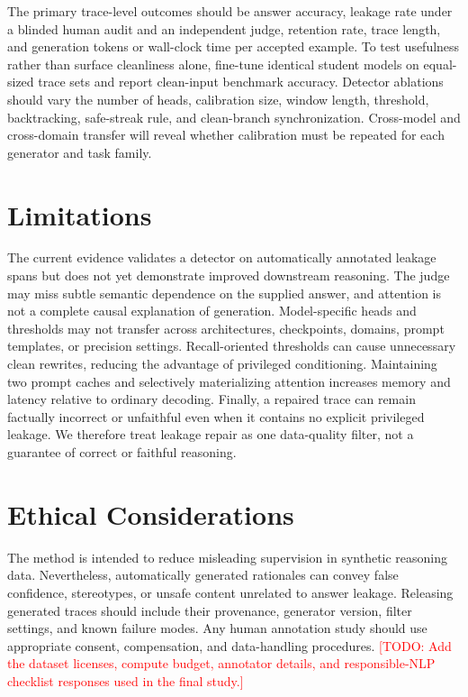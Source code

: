 \documentclass[11pt]{article}
\newcommand{\todo}[1]{\textcolor{red}{[TODO: #1]}}
\begin{document}
The primary trace-level outcomes should be answer accuracy, leakage rate under a
blinded human audit and an independent judge, retention rate, trace length, and
generation tokens or wall-clock time per accepted example.  To test usefulness
rather than surface cleanliness alone, fine-tune identical student models on
equal-sized trace sets and report clean-input benchmark accuracy.  Detector
ablations should vary the number of heads, calibration size, window length,
threshold, backtracking, safe-streak rule, and clean-branch synchronization.
Cross-model and cross-domain transfer will reveal whether calibration must be
repeated for each generator and task family.

\section{Limitations}

The current evidence validates a detector on automatically annotated leakage
spans but does not yet demonstrate improved downstream reasoning.  The judge may
miss subtle semantic dependence on the supplied answer, and attention is not a
complete causal explanation of generation.  Model-specific heads and thresholds
may not transfer across architectures, checkpoints, domains, prompt templates,
or precision settings.  Recall-oriented thresholds can cause unnecessary clean
rewrites, reducing the advantage of privileged conditioning.  Maintaining two
prompt caches and selectively materializing attention increases memory and
latency relative to ordinary decoding.  Finally, a repaired trace can remain
factually incorrect or unfaithful even when it contains no explicit privileged
leakage.  We therefore treat leakage repair as one data-quality filter, not a
guarantee of correct or faithful reasoning.

\section{Ethical Considerations}

The method is intended to reduce misleading supervision in synthetic reasoning
data.  Nevertheless, automatically generated rationales can convey false
confidence, stereotypes, or unsafe content unrelated to answer leakage.
Releasing generated traces should include their provenance, generator version,
filter settings, and known failure modes.  Any human annotation study should use
appropriate consent, compensation, and data-handling procedures.  \todo{Add the
dataset licenses, compute budget, annotator details, and responsible-NLP
checklist responses used in the final study.}
\end{document}

